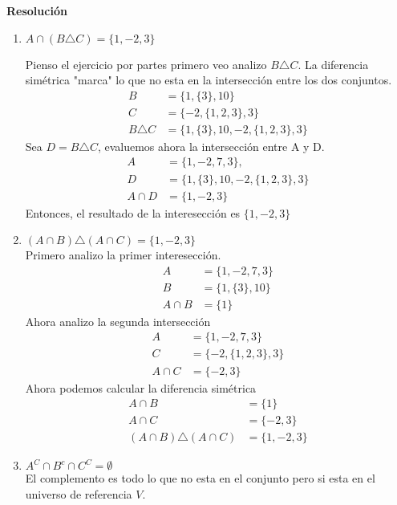 \documentclass{article}
\begin{document}
\textbf{Resolución}
\begin{enumerate}[label=\roman*)]
    \item $A \cap (B \triangle C) = \{1, -2, 3\}$
    
    Pienso el ejercicio por partes primero veo analizo $B \triangle C$. La diferencia simétrica "marca" lo que no esta en la intersección entre los dos conjuntos.
    \begin{align*}
        B &= \{1,\{3\}, 10 \} \\
        C &= \{-2,\{1,2,3\},3\} \\
        B \triangle C &= \{1, \{3\}, 10, -2, \{1,2,3\}, 3\}
    \end{align*}
    Sea $D = B \triangle C$, evaluemos ahora la intersección entre A y D.
    \begin{align*}
        A &= \{1,-2,7,3\}, \\
        D &= \{1, \{3\}, 10, -2, \{1,2,3\}, 3\}\\
        A \cap D &= \{1, -2, 3\}
    \end{align*}
    Entonces, el resultado de la interesección es $\{1, -2, 3\}$
    \item $(A \cap B) \triangle (A \cap C) =  \{1, -2, 3\} $ \\[6pt]
    Primero analizo la primer interesección.
    \begin{align*}
        A &= \{1,-2,7,3\}\\
        B &= \{1, \{3\}, 10\}\\
        A \cap B &= \{1\}
    \end{align*}
    Ahora analizo la segunda intersección
    \begin{align*}
        A &= \{1, -2, 7, 3\}\\
        C &= \{-2, \{1,2,3\}, 3\}\\
        A \cap C &= \{-2, 3\}
    \end{align*}
    Ahora podemos calcular la diferencia simétrica
    \begin{align*}
        A \cap B &= \{1\} \\
        A \cap C &= \{-2, 3\} \\
        (A \cap B) \triangle (A \cap C) &= \{1, -2, 3\}
    \end{align*}
    \item $A^{C} \cap B^{c} \cap C^{C} = \emptyset$\\
    El complemento es todo lo que no esta en el conjunto pero si esta en el universo de referencia $V$.\\

\end{enumerate}
\end{document}
